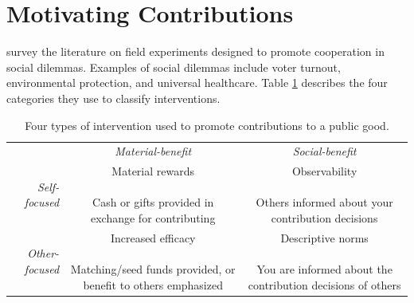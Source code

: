 \documentclass[conference]{IEEEtran}
\newcommand{\1}{\mathds{1}}
\newcommand{\myrotate}[1]{#1}
\newcommand{\PreserveBackslash}[1]{\let\temp=\\#1\let\\=\temp}
\newcommand{\mycell}[1]{\parbox[m]{1.1in}{\PreserveBackslash\raggedright \vspace{7pt} #1 \vspace{7pt}}}
\begin{document}
\section{Motivating Contributions}

\citet{Kraft-Todd} survey the literature on field experiments designed
to promote cooperation in social dilemmas. Examples of social dilemmas include voter turnout,
environmental protection, and universal healthcare. Table
\ref{tab:kraft-todd} describes the four categories they use to
classify interventions.

\begin{table}[h!tbp]
  \renewcommand{\arraystretch}{2}
  \caption{Four types of intervention used to promote contributions to a public good.}
  \label{tab:kraft-todd}
  \begin{tabular}{r|c|c|}

    \multicolumn{1}{c}{} & \multicolumn{1}{c}{\textit{Material-benefit}} & \multicolumn{1}{c}{\textit{Social-benefit}} \\
    \cline{2-3}

    \myrotate{\textit{Self-focused}} & \mycell{ Material rewards \\ \\ Cash or gifts provided in exchange for contributing } & \mycell{Observability \\ \\ Others informed about your contribution decisions} \\


    \myrotate{\textit{Other-focused}} & \mycell{ Increased efficacy \\ \\ Matching/seed funds provided, or benefit to others emphasized } & \mycell{Descriptive norms \\ \\ You are informed about the contribution decisions of others} \\

  \end{tabular}
\end{table}


\end{document}
